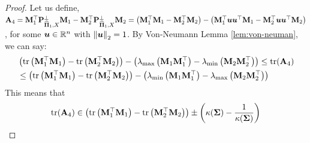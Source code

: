 \documentclass[numsec,webpdf,modern,medium,namedate]{oup-authoring-template}
\theoremstyle{thmstyleone}%
\theoremstyle{thmstyletwo}%
\theoremstyle{thmstylethree}%
\begin{document}
\begin{proof}
Let us define, $\mathbf{A}_4 =\mathbf{M}_1^\top \mathbf{P}_{\widehat{\boldsymbol{\Pi}}_1, X}^\perp  \mathbf{M}_1 - \mathbf{M}_2^\top \mathbf{P}_{\widehat{\boldsymbol{\Pi}}_1, X}^\perp  \mathbf{M}_2 = \left(\mathbf{M}_1^\top \mathbf{M}_1 - \mathbf{M}_2^\top \mathbf{M}_2\right)- \left(\mathbf{M}_1^\top \boldsymbol{u}\boldsymbol{u}^\top \mathbf{M}_1 - \mathbf{M}_2^\top \boldsymbol{u}\boldsymbol{u}^\top \mathbf{M}_2\right)$, for some $\boldsymbol{u} \in \mathbb{R}^n$ with $\left\lVert \boldsymbol{u} \right\rVert_2=1$. By Von-Neumann Lemma \ref{lem:von-neuman}, we can say:
\begin{align}
    &\left( \mathrm{tr}\left(\mathbf{M}_1^\top \mathbf{M}_1 \right) - \mathrm{tr}\left(\mathbf{M}_2^\top \mathbf{M}_2\right) \right) 
    - \left( \lambda_{\max}\left(\mathbf{M}_1 \mathbf{M}_1^\top\right) - \lambda_{\min}\left(\mathbf{M}_2 \mathbf{M}_2^\top\right) \right) 
    \leq \mathrm{tr}(\mathbf{A}_4) \notag \\
    &\leq \left( \mathrm{tr}\left(\mathbf{M}_1^\top \mathbf{M}_1 \right) - \mathrm{tr}\left(\mathbf{M}_2^\top \mathbf{M}_2\right) \right) 
    - \left( \lambda_{\min}\left(\mathbf{M}_1 \mathbf{M}_1^\top\right) - \lambda_{\max}\left(\mathbf{M}_2 \mathbf{M}_2^\top\right) \right)
\end{align}
This means that
\begin{eqnarray*}
    \mathrm{tr}(\mathbf{A}_4) \in \left( \mathrm{tr}\left(\mathbf{M}_1^\top \mathbf{M}_1 \right) - \mathrm{tr}\left(\mathbf{M}_2^\top \mathbf{M}_2\right) \right) 
    \pm \left( \kappa({\boldsymbol{\Sigma}}) - \frac{1}{\kappa({\boldsymbol{\Sigma}})} \right)
\end{eqnarray*}


\end{proof}
\end{document}
